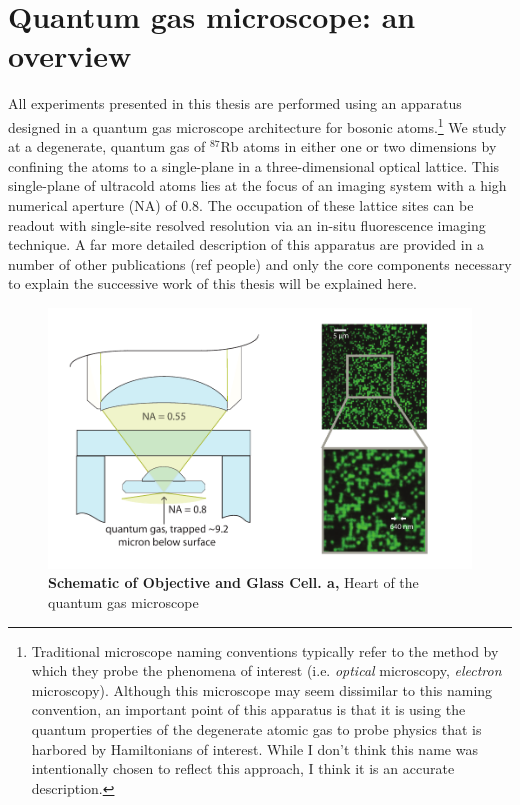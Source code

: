 

\chapter{Quantum gas microscope: \newline an overview}

\newpage

All experiments presented in this thesis are performed using an apparatus designed in a quantum gas microscope architecture for bosonic atoms.\footnote{Traditional microscope naming conventions typically refer to the method by which they probe the phenomena of interest (i.e. \emph{optical} microscopy, \emph{electron} microscopy). Although this microscope may seem dissimilar to this naming convention, an important point of this apparatus is that it is using the quantum properties of the degenerate atomic gas to probe physics that is harbored by Hamiltonians of interest. While I don't think this name was intentionally chosen to reflect this approach, I think it is an accurate description.} We study at a degenerate, quantum gas of $^{87}$Rb atoms in either one or two dimensions by confining the atoms to a single-plane in a three-dimensional optical lattice. This single-plane of ultracold atoms lies at the focus of an imaging system with a high numerical aperture (NA) of 0.8. The occupation of these lattice sites can be readout with single-site resolved resolution via an in-situ fluorescence imaging technique. A far more detailed description of this apparatus are provided in a number of other publications (ref people) and only the core components necessary to explain the successive work of this thesis will be explained here.  

\begin{figure}[ht!]
		\includegraphics[width=\columnwidth]{figures/ch2/QGM/imaging_system_green.pdf} 
		\caption{\textbf{Schematic of Objective and Glass Cell. a,}  Heart of the quantum gas microscope }
		\label{fig:qgm}	
\end{figure}

